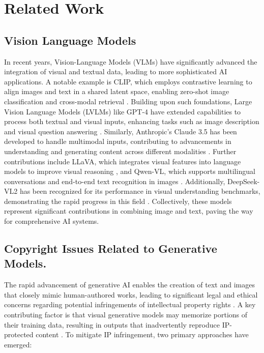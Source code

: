 \section{Related Work}
\subsection{Vision Language Models}
In recent years, Vision-Language Models (VLMs) have significantly advanced the integration of visual and textual data, leading to more sophisticated AI applications. A notable example is CLIP,  which employs contrastive learning to align images and text in a shared latent space, enabling zero-shot image classification and cross-modal retrieval \citep{pmlr-v139-radford21a}. Building upon such foundations, Large Vision Language Models (LVLMs) like GPT-4 have extended capabilities to process both textual and visual inputs, enhancing tasks such as image description and visual question answering \citep{gpt4v}. Similarly, Anthropic's Claude 3.5 has been developed to handle multimodal inputs, contributing to advancements in understanding and generating content across different modalities \citep{Claude3.5}. Further contributions include LLaVA, which integrates visual features into language models to improve visual reasoning \citep{liu2024visual}, and Qwen-VL, which supports multilingual conversations and end-to-end text recognition in images \citep{bai2023qwen}. Additionally, DeepSeek-VL2 has been recognized for its performance in visual understanding benchmarks, demonstrating the rapid progress in this field \citep{wu2024deepseek}. Collectively, these models represent significant contributions in combining image and text, paving the way for comprehensive AI systems. 

\subsection{Copyright Issues Related to Generative Models.}
The rapid advancement of generative AI enables the creation of text and images that closely mimic human-authored works, leading to significant legal and ethical concerns regarding potential infringements of intellectual property rights \cite{zirpoli2023generative, dzuong2024uncertain, sag2023copyright, polandgenerative}. A key contributing factor is that visual generative models may memorize portions of their training data, resulting in outputs that inadvertently reproduce IP-protected content \cite{carlini2023extracting, somepalli2023diffusion, gu2023memorization}. To mitigate IP infringement, two primary approaches have emerged:

